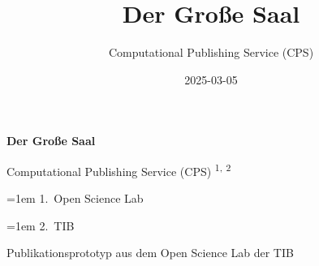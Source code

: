 \documentclass[
  a4paper,
  openany]{book}
\title{Der Große Saal}
\author{Computational Publishing Service (CPS)}
\date{2025-03-05}
\begin{document}
  \begin{frontmatter}
  \begin{titlepage}






  \begin{tcolorbox}


  \centering

  {\headingfont\Huge\bfseries\nohyphens{Der Große
  Saal}}\\[1\baselineskip]

  \end{tcolorbox}

  \bigbreak

  \begin{tcolorbox}
  \centering
      {\centering\large{Computational Publishing Service (CPS)}}%
      {\textsuperscript{1}}\textsuperscript{,}%
      {\textsuperscript{2}}%


  \vspace{2\baselineskip} 

  \hangindent=1em
  {1}.~{Open Science Lab}%
  \par\hangindent=1em%
  {2}.~{TIB}%


  \vspace{1\baselineskip} 


  \end{tcolorbox}



  \vfill

  \vspace{1\baselineskip} 

  \begin{tcolorbox}
  \centering

  {
    Publikationsprototyp aus dem Open Science Lab der TIB
  }
  \end{tcolorbox}
  \end{titlepage}
  \end{frontmatter}
\end{document}
